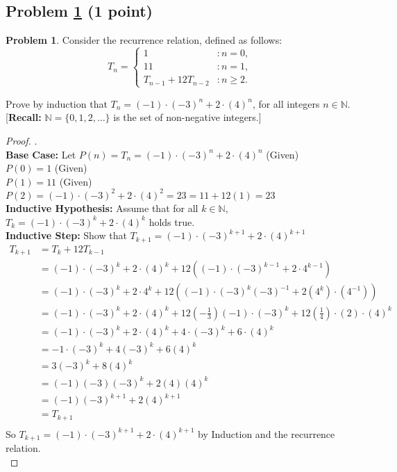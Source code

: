 \documentclass[11pt]{article}
\theoremstyle{definition}
\theoremstyle{definition}
\newtheorem{required}{Problem}
\theoremstyle{definition}
\begin{document}
\newpage
\subsection{Problem \ref{Induction2} (1 point)} 
\begin{required} \label{Induction2}
Consider the recurrence relation, defined as follows:
\[
T_{n} = \begin{cases} 1 & : n = 0, \\
11 & : n = 1, \\
T_{n-1} + 12 T_{n-2} & : n \geq 2.
\end{cases}
\]

\noindent Prove by induction that $T_{n} = (-1) \cdot (-3)^{n} + 2 \cdot (4)^{n}$, for all integers $n \in \mathbb{N}$. [\textbf{Recall:} $\mathbb{N} = \{0, 1, 2, \ldots \}$ is the set of non-negative integers.]
\end{required}

\begin{proof}.\\
\indent \textbf{Base Case:}
Let $P(n) = T_{n} = (-1) \cdot (-3)^{n} + 2 \cdot (4)^{n}$ (Given) \\
\indent $P(0) = 1$ (Given) \\
\indent $P(1) = 11$ (Given) \\
\indent $P(2) = (-1) \cdot (-3)^{2} + 2 \cdot (4)^{2} = 23 = 11 + 12(1) = 23$ \\

\textbf{Inductive Hypothesis:}
Assume that for all $k \in \mathbb{N}$, $T_{k} = (-1) \cdot (-3)^{k} + 2 \cdot (4)^{k}$ holds true.\\

\textbf{Inductive Step:}
Show that $T_{k+1} = (-1) \cdot (-3)^{k+1} + 2 \cdot (4)^{k+1}$\\

\begin{align*}
	T_{k+1} &= T_{k} + 12T_{k-1}\\
	&= (-1) \cdot (-3)^{k} + 2 \cdot (4)^k + 12((-1)\cdot(-3)^{k-1} + 2 \cdot 4^{k-1})\\
	&= (-1) \cdot (-3)^k + 2 \cdot 4^k + 12((-1) \cdot (-3)^k(-3)^{-1} + 2(4^k)\cdot(4^{-1}))\\
	&= (-1) \cdot (-3)^k + 2 \cdot (4)^k + 12(-\frac{1}{3})(-1)\cdot(-3)^k + 12(\frac{1}{4})\cdot(2)\cdot(4)^k\\
	&=(-1)\cdot(-3)^k + 2 \cdot (4)^k + 4\cdot(-3)^k + 6 \cdot(4)^k\\
	&= -1 \cdot (-3)^k + 4 (-3)^k + 6(4)^k\\
	&= 3(-3)^k + 8(4)^k\\
	&= (-1)(-3)(-3)^k + 2(4)(4)^k\\
	&=(-1)(-3)^{k+1} + 2(4)^{k+1}\\
	&= T_{k+1}\\
\end{align*}
So $T_{k+1} = (-1) \cdot (-3)^{k+1} + 2 \cdot (4)^{k+1}$ by Induction and the recurrence relation.\\
\end{proof}
\end{document}
